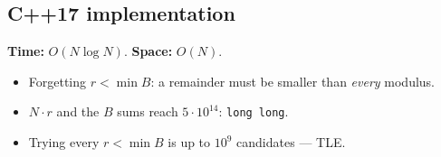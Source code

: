 \subsection*{C++17 implementation}

\begin{complexitybox}
\textbf{Time:} $O(N\log N)$. \textbf{Space:} $O(N)$.
\end{complexitybox}

\begin{pitfallbox}
\begin{itemize}
  \item Forgetting $r<\min B$: a remainder must be smaller than \emph{every}
        modulus.
  \item $N\cdot r$ and the $B$ sums reach $5\cdot10^{14}$: \texttt{long long}.
  \item Trying every $r<\min B$ is up to $10^9$ candidates --- TLE.
\end{itemize}
\end{pitfallbox}
